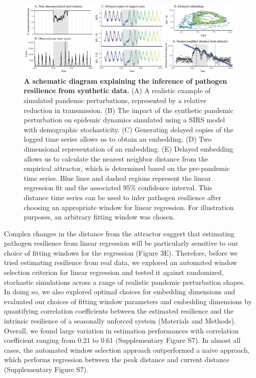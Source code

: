 \documentclass[12pt]{article}
\begin{document}
\begin{figure}[!ht]
\includegraphics[width=\textwidth]{../figure3/figure3.pdf}
\caption{
\textbf{A schematic diagram explaining the inference of pathogen resilience from synthetic data.}
(A) A realistic example of simulated pandemic perturbations, represented by a relative reduction in transmission.
(B) The impact of the synthetic pandemic perturbation on epidemic dynamics simulated using a SIRS model with demographic stochasticity.
(C) Generating delayed copies of the logged time series allows us to obtain an embedding.
(D) Two dimensional representation of an embedding.
(E) Delayed embedding allows us to calculate the nearest neighbor distance from the empirical attractor, which is determined based on the pre-pandemic time series.
Blue lines and dashed regions represent the linear regression fit and the associated 95\% confidence interval.
This distance time series can be used to infer pathogen resilience after choosing an appropriate window for linear regression.
For illustration purposes, an arbitrary fitting window was chosen.
}
\end{figure}

Complex changes in the distance from the attractor suggest that estimating pathogen resilience from linear regression will be particularly sensitive to our choice of fitting windows for the regression (Figure 3E).
Therefore, before we tried estimating resilience from real data, we explored an automated window selection criterion for linear regression and tested it against randomized, stochastic simulations across a range of realistic pandemic perturbation shapes.
In doing so, we also explored optimal choices for embedding dimensions and evaluated our choices of fitting window parameters and embedding dimensions by quantifying correlation coefficients between the estimated resilience and the intrinsic resilience of a seasonally unforced system (Materials and Methods).
Overall, we found large variation in estimation performances with correlation coefficient ranging from 0.21 to 0.61 (Supplementary Figure S7).
In almost all cases, the automated window selection approach outperformed a naive approach, which performs regression between the peak distance and current distance (Supplementary Figure S7).
\end{document}
